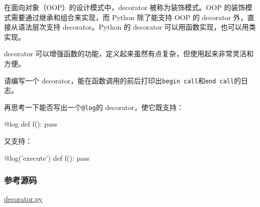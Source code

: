 在面向对象（OOP）的设计模式中，decorator 被称为装饰模式。OOP
的装饰模式需要通过继承和组合来实现，而 Python 除了能支持 OOP 的
decorator 外，直接从语法层次支持 decorator。Python 的 decorator
可以用函数实现，也可以用类实现。

decorator
可以增强函数的功能，定义起来虽然有点复杂，但使用起来非常灵活和方便。

请编写一个
decorator，能在函数调用的前后打印出\texttt{\textquotesingle{}begin\ call\textquotesingle{}}和\texttt{\textquotesingle{}end\ call\textquotesingle{}}的日志。

再思考一下能否写出一个\texttt{@log}的 decorator，使它既支持：

\begin{pythoncode}
@log
def f():
    pass
\end{pythoncode}

又支持：

\begin{pythoncode}
@log('execute')
def f():
    pass
\end{pythoncode}

\hypertarget{ux53c2ux8003ux6e90ux7801}{%
\subsubsection{参考源码}\label{ux53c2ux8003ux6e90ux7801}}

\href{https://github.com/michaelliao/learn-python3/blob/master/samples/functional/decorator.py}{decorator.py}

